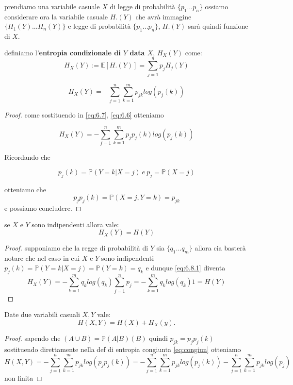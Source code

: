 prendiamo una variabile casuale $X$ di legge di probabilità $\{ p _1...p_n\}$ ossiamo considerare ora la variabile casuale $H.(Y)$ che avrà immagine $\{H_1(Y)...H_n(Y) \}$ e legge di probabilità $\{ p _1...p_n\}$, $H.(Y)$ sarà quindi funzione di $X$.
\begin{defi}
definiamo l'\textbf{entropia condizionale di $Y$ data $X$}, $H_X(Y)$ come:
\begin{equation}\label{eq:6.7}
H_X(Y):= \mathbb{E}[H.(Y)]= \sum_{j=1}^n p_j H_j(Y)
\end{equation}
\end{defi}



\begin{lem}
\begin{equation}
H_X(Y)=-\sum_{j=1}^n\sum_{k=1}^m p_{jk}log(p_j(k))
\end{equation}
\end{lem}
\begin{proof}
come sostituendo in \ref{eq:6.7}, \ref{eq:6.6} otteniamo

\begin{equation} \label{eq:6.8.1}
H_X(Y)=-\sum_{j=1}^n\sum_{k=1}^m p_{j}p_j(k)log(p_j(k))
\end{equation}

Ricordando che 

$$p_j(k)=\mathbb{P}(Y=k|X=j)\ e \ p_j=\mathbb{P}(X=j)$$

otteniamo che 
$$p_jp_j(k)=\mathbb{P}(X=j,Y=k)=p_{jk}$$
e possiamo concludere.
\end{proof}


\begin{lem}
se $X$ e $Y$ sono indipendenti allora vale:
\begin{equation}
H_X(Y)=H(Y)
\end{equation}
\end{lem}
\begin{proof}
supponiamo che la regge di probabilità di $Y$ sia $\{q_1...q_m\}$ allora cia basterà notare che nel caso in cui $X$ e $Y$ sono indipendenti $p_j(k)=\mathbb{P}(Y=k|X=j)=\mathbb{P}(Y=k)=q_k$
e dunque \ref{eq:6.8.1} diventa
$$H_X(Y)=-\sum_{k=1}^m q_klog(q_k)\sum_{j=1}^n p_{j}=-\sum_{k=1}^m q_klog(q_k)1=H(Y)$$
\end{proof}
\begin{teo}
Date due variabili casuali $X,Y$ vale:
\begin{equation}
H(X,Y)=H(X)+H_X(y).
\end{equation}
\end{teo}
\begin{proof}
sapendo che \p$(A\cup B)=\mathbb{P}(A|B)$\p$(B)$ quindi $p_{jk}=p_jp_j(k)$ sostituendo direttamente nella def di entropia congiunta \ref{eq:congiun} otteniamo
$$H(X,Y)=-\sum_{j=1}^n\sum_{k=1}^m p_{jk}log(p_{j}p_{j}(k))=-\sum_{j=1}^n\sum_{k=1}^m p_{jk}log(p_{j}(k))-\sum_{j=1}^n\sum_{k=1}^m p_{jk}log(p_{j})$$
non finita
\end{proof}















